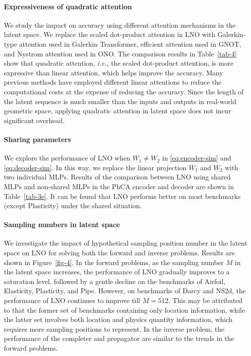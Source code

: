 \documentclass{article}
\begin{document}
\paragraph{Expressiveness of quadratic attention}
We study the impact on accuracy using different attention mechanisms in the latent space.
We replace the scaled dot-product attention in LNO with Galerkin-type attention used in Galerkin Transformer\cite{GalerkinTransformer}, efficient attention\cite{EA} used in GNOT\cite{GNOT}, and Nystrom attention\cite{NA} used in ONO\cite{ONO}. 
The comparison results in Table~\ref{tab-4} show that quadratic attention, {\em i.e.,} the scaled dot-product attention\cite{Attention}, is more expressive than linear attention, which helps improve the accuracy. Many previous methods have employed different linear attentions\cite{GalerkinTransformer, GNOT, ONO} to reduce the computational costs at the expense of reducing the accuracy. Since the length of the latent sequence is much smaller than the inputs and outputs in real-world geometric space, applying quadratic attention in latent space does not incur significant overhead. 

\paragraph{Sharing parameters}
We explore the performance of LNO when ${W}_1 \ne {W}_2$ in \eqref{eq:encoder-sim} and \eqref{eq:decoder-sim}. In this way, we replace the linear projection $W_1$ and $W_2$ with two individual MLPs. Results of the comparison between LNO using shared MLPs and non-shared MLPs in the PhCA encoder and decoder are shown in Table~\ref{tab-3e}. It can be found that LNO performs better on most benchmarks (except Plasticity) under the shared situation.

\paragraph{Sampling numbers in latent space } We investigate the impact of hypothetical sampling position number in the latent space on LNO for solving both the forward and inverse problems. Results are shown in Figure~\ref{fig-4}. In the forward problems, as the sampling number $M$ in the latent space increases, the performance of LNO gradually improves to a saturation level, followed by a gentle decline on the benchmarks of Airfoil, Elasticity, Plasticity, and Pipe. However, on benchmarks of Darcy and NS2d, the performance of LNO continues to improve till $M=512$. This may be attributed to that the former set of benchmarks containing only location information, while the latter set involves both location and physics quantity information, which requires more sampling positions to represent. In the inverse problem, the performance of the completer and propagator are similar to the trends in the forward problems.
\end{document}
